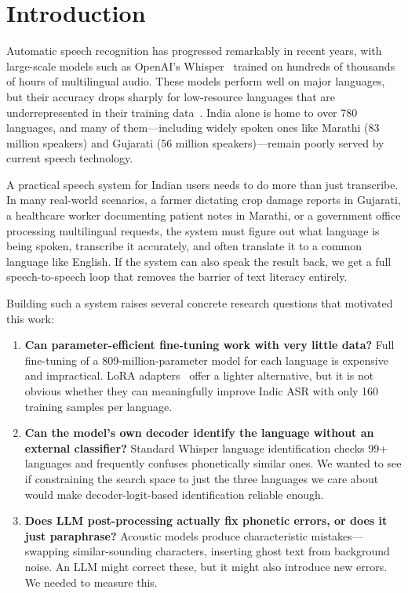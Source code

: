 
\section{Introduction}
\label{sec:intro}

Automatic speech recognition has progressed remarkably in recent years, with large-scale models such as OpenAI's Whisper~\cite{radford2023whisper} trained on hundreds of thousands of hours of multilingual audio. These models perform well on major languages, but their accuracy drops sharply for low-resource languages that are underrepresented in their training data~\cite{joshi2020state}. India alone is home to over 780 languages, and many of them---including widely spoken ones like Marathi (83 million speakers) and Gujarati (56 million speakers)---remain poorly served by current speech technology.

A practical speech system for Indian users needs to do more than just transcribe. In many real-world scenarios, a farmer dictating crop damage reports in Gujarati, a healthcare worker documenting patient notes in Marathi, or a government office processing multilingual requests, the system must figure out what language is being spoken, transcribe it accurately, and often translate it to a common language like English. If the system can also speak the result back, we get a full speech-to-speech loop that removes the barrier of text literacy entirely.

Building such a system raises several concrete research questions that motivated this work:

\begin{enumerate}[leftmargin=*]
    \item \textbf{Can parameter-efficient fine-tuning work with very little data?} Full fine-tuning of a 809-million-parameter model for each language is expensive and impractical. LoRA adapters~\cite{hu2022lora} offer a lighter alternative, but it is not obvious whether they can meaningfully improve Indic ASR with only 160 training samples per language.

    \item \textbf{Can the model's own decoder identify the language without an external classifier?} Standard Whisper language identification checks 99+ languages and frequently confuses phonetically similar ones. We wanted to see if constraining the search space to just the three languages we care about would make decoder-logit-based identification reliable enough.

    \item \textbf{Does LLM post-processing actually fix phonetic errors, or does it just paraphrase?} Acoustic models produce characteristic mistakes---swapping similar-sounding characters, inserting ghost text from background noise. An LLM might correct these, but it might also introduce new errors. We needed to measure this.
\end{enumerate}

